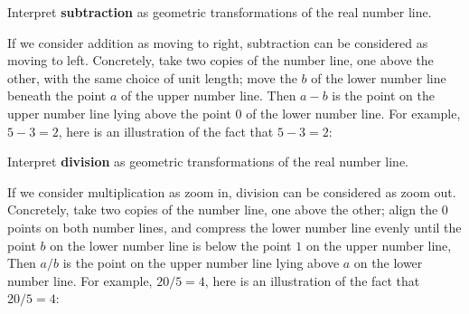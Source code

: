 \begin{solution}
Interpret \textbf{subtraction} as geometric transformations of the real number line.

If we consider addition as moving to right, subtraction can be considered as moving to left. Concretely, take two copies of the number line, one above the other, with the same choice of unit length; move the $b$ of the lower number line beneath the point $a$ of the upper number line. Then $a-b$ is the point on the upper number line lying above the point $0$ of the lower number line. For example, $5-3=2$, here is an illustration of the fact that $5-3=2$:
\begin{center}
\end{center}

Interpret \textbf{division} as geometric transformations of the real number line.

If we consider multiplication as zoom in, division can be considered as zoom out. Concretely, take two copies of the number line, one above the other; align the $0$ points on both number lines, and compress the lower number line evenly until the point $b$ on the lower number line is below the point $1$ on the upper number line, Then $a/b$ is the point on the upper number line lying above $a$ on the lower number line. For example, $20/5=4$, here is an illustration of the fact that $20/5=4$:
\begin{center}
\end{center}
\end{solution}

